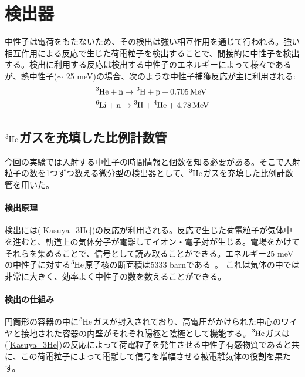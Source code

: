 \section{検出器}
中性子は電荷をもたないため、その検出は強い相互作用を通じて行われる。強い相互作用による反応で生じた荷電粒子を検出することで、間接的に中性子を検出する。検出に利用する反応は検出する中性子のエネルギーによって様々であるが、熱中性子($\sim$ 25 meV)の場合、次のような中性子捕獲反応が主に利用される:
\begin{align}
&\ce{^3He} + \ce{n} \to \ce{^3H}+\ce{p} + 0.705 \, \mathrm{MeV} \label{Kasuya_3He} \\
&\ce{^6Li} + \ce{n} \to \ce{^3H}+\ce{^4He}+4.78 \, \mathrm{MeV} \label{Kasuya_6Li}
\end{align}

\subsection{$\ce{^3He}$ガスを充填した比例計数管}
今回の実験では入射する中性子の時間情報と個数を知る必要がある。そこで入射粒子の数を1つずつ数える微分型の検出器として、$\ce{^3He}$ガスを充填した比例計数管を用いた。

\paragraph{検出原理}
検出には(\ref{Kasuya_3He})の反応が利用される。反応で生じた荷電粒子が気体中を進むと、軌道上の気体分子が電離してイオン・電子対が生じる。電場をかけてそれらを集めることで、信号として読み取ることができる。エネルギー25 meVの中性子に対する$\ce{^3He}$原子核の断面積は5333 barnである~\cite{JENDL}。
これは気体の中では非常に大きく、効率よく中性子の数を数えることができる。

\paragraph{検出の仕組み}
円筒形の容器の中に$\ce{^3He}$ガスが封入されており、高電圧がかけられた中心のワイヤと接地された容器の内壁がそれぞれ陽極と陰極として機能する。$\ce{^3He}$ガスは(\ref{Kasuya_3He})の反応によって荷電粒子を発生させる中性子有感物質であると共に、この荷電粒子によって電離して信号を増幅させる被電離気体の役割を果たす。

